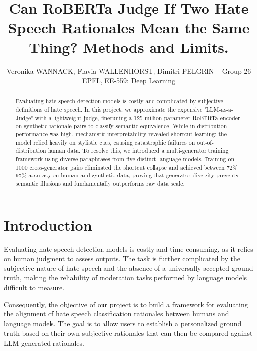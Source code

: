\documentclass[10pt,conference,compsocconf]{IEEEtran}
\begin{document}
 \title{\fontsize{20}{22}\selectfont Can RoBERTa Judge If Two Hate Speech Rationales Mean
  the Same Thing? Methods and Limits.}

\author{
  Veronika WANNACK, Flavia WALLENHORST, Dimitri PELGRIN – Group 26
\\
  EPFL, EE-559: Deep Learning
}

\maketitle

\begin{abstract}

Evaluating hate speech detection models is costly and complicated by subjective definitions of hate speech. In this project, we approximate the expensive "LLM-as-a-Judge" with a lightweight judge, finetuning a 125-million parameter RoBERTa encoder on synthetic rationale pairs to classify semantic equivalence. While in-distribution performance was high, mechanistic interpretability revealed shortcut learning; the model relied heavily on stylistic cues, causing catastrophic failures on out-of-distribution human data. To resolve this, we introduced a multi-generator training framework using diverse paraphrases from five distinct language models. Training on 1000 cross-generator pairs eliminated the shortcut collapse and achieved between 72\%–95\% accuracy on human and synthetic data, proving that generator diversity prevents semantic illusions and fundamentally outperforms raw data scale.

\end{abstract}

\section{Introduction}

Evaluating hate speech detection models is costly and time-consuming, as it relies on human judgment to assess outputs. The task is further complicated by the subjective nature of hate speech and the absence of a universally accepted ground truth, making the reliability of moderation tasks performed by language models difficult to measure.

Consequently, the objective of our project is to build a framework for evaluating the alignment of hate speech classification rationales between humans and language models. The goal is to allow users to establish a personalized ground truth based on their own subjective rationales that can then be compared against LLM-generated rationales. 
\end{document}
